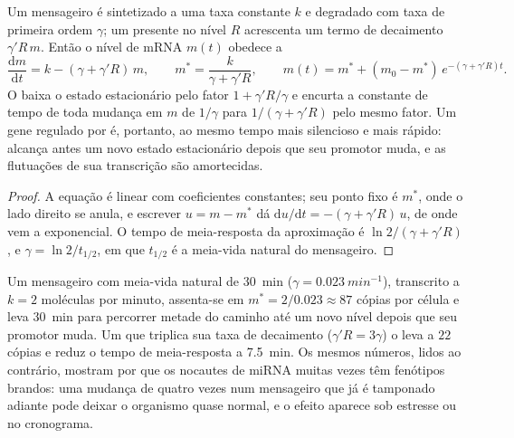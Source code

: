 
\begin{theorem}\label{thm:b3:rna-regulation:mirna-kinetics}
Um mensageiro é sintetizado a uma taxa constante $k$ e degradado com
taxa de primeira ordem $\gamma$; um  presente no nível $R$
acrescenta um termo de decaimento $\gamma' R\, m$. Então o nível de
mRNA $m(t)$ obedece a
\[
\frac{\mathrm{d}m}{\mathrm{d}t} = k - (\gamma + \gamma' R)\, m,
\qquad
m^{*} = \frac{k}{\gamma + \gamma' R},
\qquad
m(t) = m^{*} + (m_{0} - m^{*})\,e^{-(\gamma + \gamma' R)t}.
\]
O  baixa o estado estacionário pelo fator $1 + \gamma' R/
\gamma$ e encurta a constante de tempo de toda mudança em $m$ de
$1/\gamma$ para $1/(\gamma + \gamma' R)$ pelo mesmo fator. Um gene
regulado por  é, portanto, ao mesmo tempo mais silencioso e
mais rápido: alcança antes um novo estado estacionário depois que seu
promotor muda, e as flutuações de sua transcrição são amortecidas.
\end{theorem}
\begin{proof}
A equação é linear com coeficientes constantes; seu ponto fixo é
$m^{*}$, onde o lado direito se anula, e escrever $u = m - m^{*}$ dá
$\mathrm{d}u/\mathrm{d}t = -(\gamma + \gamma' R)\,u$, de onde vem a
exponencial. O tempo de meia-resposta da aproximação é $\ln 2/(\gamma + \gamma'
R)$, e $\gamma = \ln 2 / t_{1/2}$, em que $t_{1/2}$ é a meia-vida
natural do mensageiro.
\end{proof}

\begin{example}\label{ex:b3:rna-regulation:fourfold}
Um mensageiro com meia-vida natural de \qty{30}{min} ($\gamma =
\qty{0.023}{min^{-1}}$), transcrito a $k = 2$ moléculas por minuto,
assenta-se em $m^{*} = 2/0.023 \approx 87$ cópias por célula e leva
\qty{30}{min} para percorrer metade do caminho até um novo nível
depois que seu promotor muda. Um  que triplica sua taxa de
decaimento ($\gamma' R = 3\gamma$) o leva a $22$ cópias e reduz o
tempo de meia-resposta a \qty{7.5}{min}. Os mesmos números, lidos ao
contrário, mostram por que os nocautes de miRNA muitas vezes têm
fenótipos brandos: uma mudança de quatro vezes num mensageiro que já é
tamponado adiante pode deixar o organismo quase normal, e o efeito
aparece sob estresse ou no cronograma.
\end{example}

